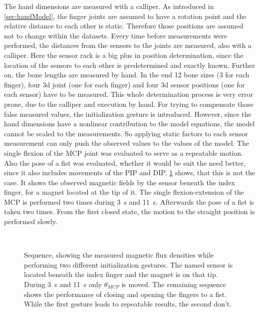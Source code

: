 The hand dimensions are measured with a calliper. As introduced in \ref{sec:handModel}, the finger joints are assumed to have a rotation point and the relative distance to each other is static. Therefore those positions are assumed not to change within the datasets. Every time before measurements were performed, the distances from the sensors to the joints are measured, also with a calliper. Here the sensor rack is a big plus in position determination, since the location of the sensors to each other is predetermined and exactly known. Further on, the bone lengths are measured by hand. In the end 12 bone sizes (3 for each finger), four 3d joint (one for each finger) and four 3d sensor positions (one for each sensor) have to be measured. This whole determination process is very error prone, due to the calliper and execution by hand. For trying to compensate those false measured values, the initialization gesture is introduced. However, since the hand dimensions have a nonlinear contribution to the model equations, the model cannot be scaled to the measurements. So applying static factors to each sensor measurement can only push the observed values to the values of the model. The single flexion of the \ac{MCP} joint was evaluated to serve as a repeatable motion. Also the pose of a fist was evaluated, whether it would be suit the need better, since it also includes movements of the \ac{PIP} and \ac{DIP}. \ref{fig:set1mag} shows, that this is not the case. It shows the observed magnetic fields by the sensor beneath the index finger, for a magnet located at the tip of it. The single flexion-extension of the \ac{MCP} is performed two times during \SI{3}{\second} and \SI{11}{\second}. Afterwards the pose of a fist is taken two times. From the first closed state, the motion to the straight position is performed slowly. 
\begin{figure}[!htb]
\centering
{}\\
\caption[Measured magnetic flux densities for various initialization gestures]
{Sequence, showing the measured magnetic flux densities while performing two different initialization gestures. The named sensor is located beneath the index finger and the magnet is on that tip. During \SI{3}{\second} and \SI{11}{\second} only $ \theta_{MCP} $ is moved. The remaining sequence shows the performance of closing and opening the fingers to a fist. While the first gesture leads to repeatable results, the second don't.}
\label{fig:set1mag}
\end{figure}
